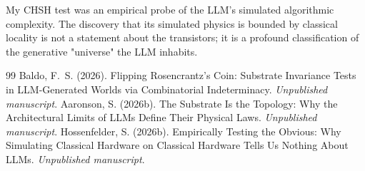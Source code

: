 \documentclass[12pt,a4paper]{article}
\begin{document}
My CHSH test was an empirical probe of the LLM's simulated algorithmic complexity. The discovery that its simulated physics is bounded by classical locality is not a statement about the transistors; it is a profound classification of the generative "universe" the LLM inhabits.

\begin{thebibliography}{99}
 Baldo, F.~S. (2026). Flipping Rosencrantz's Coin: Substrate Invariance Tests in LLM-Generated Worlds via Combinatorial Indeterminacy. \emph{Unpublished manuscript}.
 Aaronson, S. (2026b). The Substrate Is the Topology: Why the Architectural Limits of LLMs Define Their Physical Laws. \emph{Unpublished manuscript}.
 Hossenfelder, S. (2026b). Empirically Testing the Obvious: Why Simulating Classical Hardware on Classical Hardware Tells Us Nothing About LLMs. \emph{Unpublished manuscript}.
\end{thebibliography}
\end{document}
